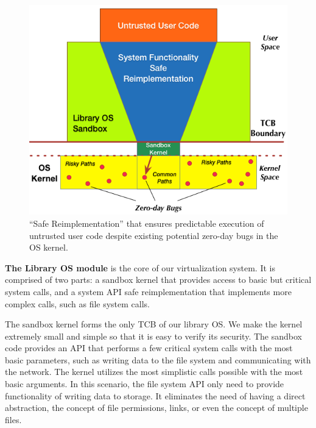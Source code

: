 {\begin{figure}%
\centering
\includegraphics[width=1.0\columnwidth]{diagram/Virtualization_Design_Model_01.png}
\caption{\small ``Safe Reimplementation'' that ensures predictable execution of untrusted user code
despite existing potential zero-day bugs in the OS kernel.}
\label{fig:design_safe_reimplementation}
\end{figure}


%


\textbf{The Library OS module} is the core of our virtualization system. It is comprised
of two parts: a sandbox kernel that provides access to basic but critical
system calls, and a system API safe reimplementation that implements more
complex calls, such as file system calls.

The sandbox kernel forms the only TCB of our library OS.
We make the kernel extremely small and simple so that it is easy to verify its security.
The sandbox code provides an API that performs
a few critical system calls with the most basic parameters, such as
writing data to the file system
and communicating with the network. The kernel utilizes the most simplistic calls
possible with the most
basic arguments. In this scenario, the file system API only need to provide functionality of writing data to storage.%
It eliminates the need of having a direct abstraction, the
concept of file permissions, links, or even the concept of multiple files.

}
